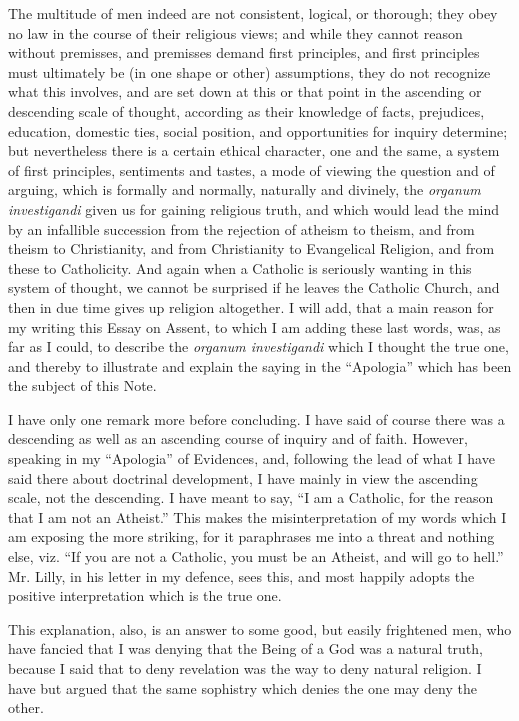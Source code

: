 The multitude of men indeed are not consistent, logical, or
thorough; they obey no law in the course of their religious views; and
while they cannot reason without premisses, and premisses demand first
principles, and first principles must ultimately be (in one shape or
other) assumptions, they do not recognize what this involves, and are
set down at this or that point in the ascending or descending scale of
thought, according as their knowledge of facts, prejudices, education,
domestic ties, social position, and opportunities for inquiry
determine; but nevertheless there is a certain ethical character, one
and the same, a system of first principles, sentiments and tastes, a
mode of viewing the question and of arguing, which is formally and
normally, naturally and divinely, the \emph{organum investigandi}
given us for gaining religious truth, and which would lead the mind by
an infallible succession from the rejection of atheism to theism, and
from theism to Christianity, and from Christianity to Evangelical
Religion, and from these to Catholicity. And again when a Catholic is
seriously wanting in this system of thought, we cannot be surprised if
he leaves the Catholic Church, and then in due time gives up religion
altogether. I will add, that a main reason for my writing this Essay
on Assent, to which I am adding these last words, was, as far as I
could, to describe the \emph{organum investigandi} which I thought the
true one, and thereby to illustrate and explain the saying in the
``Apologia'' which has been the subject of this Note.


I have only one remark more before concluding. I have said of
course there was a descending as well as an ascending course of
inquiry and of faith. However, speaking in my ``Apologia'' of
Evidences, and, following the lead of what I have said there about
doctrinal development, I have mainly in view the ascending scale, not
the descending. I have meant to say, ``I am a Catholic, for the
reason that I am not an Atheist.'' This makes the
misinterpretation of my words which I am exposing the more striking,
for it paraphrases me into a threat and nothing else, viz. ``If
you are not a Catholic, you must be an Atheist, and will go to
hell.'' Mr. Lilly, in his letter in my defence, sees this, and
most happily adopts the positive interpretation which is the true one.


This explanation, also, is an answer to some good, but easily
frightened men, who have fancied that I was denying that the Being of
a God was a natural truth, because I said that to deny revelation was the way to deny natural religion. I have but argued
that the same sophistry which denies the one may deny the other.


